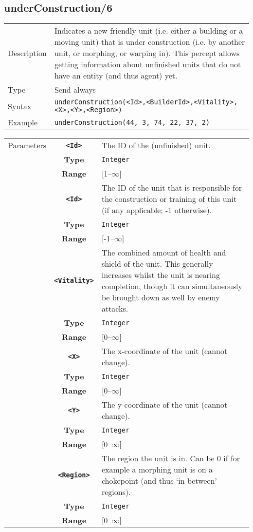 \subsection{underConstruction/6}
\begin{tabularx}{\textwidth}{lX}
 Description & Indicates a new friendly unit (i.e. either a building or a moving unit) that is under construction (i.e. by another unit, or morphing, or warping in). This percept allows getting information about unfinished units that do not have an entity (and thus agent) yet. \\
 Type & Send always \\
 Syntax & \verb|underConstruction(<Id>,<BuilderId>,<Vitality>,<X>,<Y>,<Region>)| \\
 Example & \verb|underConstruction(44, 3, 74, 22, 37, 2)|   \\
 \end{tabularx}
 \begin{tabularx}{\textwidth}{l | c | p{8cm}|}
 \cline{2-3}
 Parameters & \textbf{\verb|<Id>|} & The ID of the (unfinished) unit.\\
            & \textbf{Type} & \verb|Integer| \\
            & \textbf{Range} & [1--$\infty$] \\
            \cline{2-3}
            & \textbf{\verb|<Id>|} & The ID of the unit that is responsible for the construction or training of this unit (if any applicable; -1 otherwise).\\
            & \textbf{Type} & \verb|Integer| \\
            & \textbf{Range} & [-1--$\infty$] \\
            \cline{2-3}
            & \textbf{\verb|<Vitality>|} & The combined amount of health and shield of the unit. This generally increases whilst the unit is nearing completion, though it can simultaneously be brought down as well by enemy attacks.\\
            & \textbf{Type} & \verb|Integer| \\
            & \textbf{Range} & [0--$\infty$] \\
            \cline{2-3}
            & \textbf{\verb|<X>|} & The x-coordinate of the unit (cannot change). \\
            & \textbf{Type} & \verb|Integer| \\
            &\textbf{Range} &  [0--$\infty$] \\
            \cline{2-3}
            & \textbf{\verb|<Y>|} & The y-coordinate of the unit (cannot change). \\
            & \textbf{Type} & \verb|Integer| \\
            &\textbf{Range} & [0--$\infty$] \\
            \cline{2-3}
            & \textbf{\verb|<Region>|} & The region the unit is in. Can be 0 if for example a morphing unit is on a chokepoint (and thus `in-between' regions).\\
            & \textbf{Type} & \verb|Integer| \\
            & \textbf{Range} & [0--$\infty$] \\
            \cline{2-3}
\end{tabularx}

